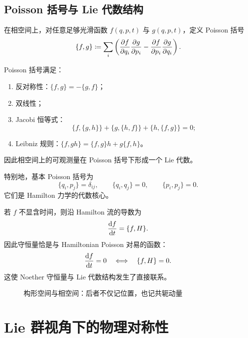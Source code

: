 \subsection{Poisson 括号与 Lie 代数结构}

在相空间上，对任意足够光滑函数 $f(q,p,t)$ 与 $g(q,p,t)$，定义 Poisson 括号
\[
  \{f,g\}
  \coloneqq
  \sum_i\left(
    \pdv{f}{q_i}\pdv{g}{p_i}-\pdv{f}{p_i}\pdv{g}{q_i}
  \right).
\]

\begin{proposition}
Poisson 括号满足：
\begin{enumerate}
  \item 反对称性：$\{f,g\}=-\{g,f\}$；
  \item 双线性；
  \item Jacobi 恒等式：
  \[
    \{f,\{g,h\}\}+\{g,\{h,f\}\}+\{h,\{f,g\}\}=0;
  \]
  \item Leibniz 规则：$\{f,gh\}=\{f,g\}h+g\{f,h\}$。
\end{enumerate}
因此相空间上的可观测量在 Poisson 括号下形成一个 Lie 代数。
\end{proposition}

特别地，基本 Poisson 括号为
\[
  \{q_i,p_j\}=\delta_{ij},
  \qquad
  \{q_i,q_j\}=0,
  \qquad
  \{p_i,p_j\}=0.
\]
它们是 Hamilton 力学的代数核心。

若 $f$ 不显含时间，则沿 Hamilton 流的导数为
\[
  \dv{f}{t}=\{f,H\}.
\]
因此守恒量恰是与 Hamiltonian Poisson 对易的函数：
\[
  \dv{f}{t}=0
  \quad\Longleftrightarrow\quad
  \{f,H\}=0.
\]
这使 Noether 守恒量与 Lie 代数结构发生了直接联系。

\begin{figure}[htbp]
\centering
{}
\caption{构形空间与相空间：后者不仅记位置，也记共轭动量}
\end{figure}

\section{Lie 群视角下的物理对称性}

